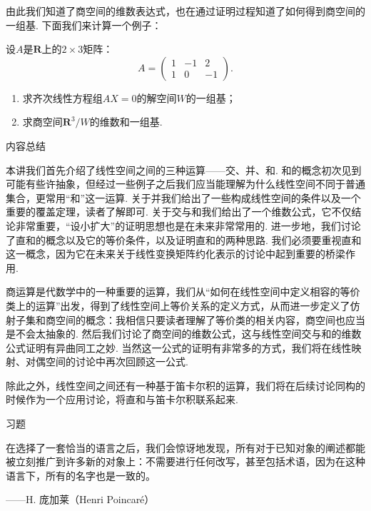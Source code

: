 由此我们知道了商空间的维数表达式，也在通过证明过程知道了如何得到商空间的一组基. 下面我们来计算一个例子：

\begin{example}{}{}
    设$A$是$\mathbf{R}$上的$2\times 3$矩阵：
    \[A=\begin{pmatrix}
            1 & -1 & 2 \\ 1 & 0 & -1
        \end{pmatrix}.\]
    \begin{enumerate}
        \item 求齐次线性方程组$AX=0$的解空间$W$的一组基；

        \item 求商空间$\mathbf{R}^3/W$的维数和一组基.
    \end{enumerate}
\end{example}

\begin{solution}

\end{solution}

\vspace{2ex}
\centerline{\heiti \Large 内容总结}

本讲我们首先介绍了线性空间之间的三种运算——交、并、和. 和的概念初次见到可能有些许抽象，但经过一些例子之后我们应当能理解为什么线性空间不同于普通集合，更常用``和''这一运算. 关于并我们给出了一些构成线性空间的条件以及一个重要的覆盖定理，读者了解即可. 关于交与和我们给出了一个维数公式，它不仅结论非常重要，``设小扩大''的证明思想也是在未来非常常用的. 进一步地，我们讨论了直和的概念以及它的等价条件，以及证明直和的两种思路. 我们必须要重视直和这一概念，因为它在未来关于线性变换矩阵约化表示的讨论中起到重要的桥梁作用.

商运算是代数学中的一种重要的运算，我们从``如何在线性空间中定义相容的等价类上的运算''出发，得到了线性空间上等价关系的定义方式，从而进一步定义了仿射子集和商空间的概念：我相信只要读者理解了等价类的相关内容，商空间也应当是不会太抽象的. 然后我们讨论了商空间的维数公式，这与线性空间交与和的维数公式证明有异曲同工之妙. 当然这一公式的证明有非常多的方式，我们将在线性映射、对偶空间的讨论中再次回顾这一公式.

除此之外，线性空间之间还有一种基于笛卡尔积的运算，我们将在后续讨论同构的时候作为一个应用讨论，将直和与笛卡尔积联系起来.

\vspace{2ex}
\centerline{\heiti \Large 习题}

\vspace{2ex}
{\kaishu 在选择了一套恰当的语言之后，我们会惊讶地发现，所有对于已知对象的阐述都能被立刻推广到许多新的对象上：不需要进行任何改写，甚至包括术语，因为在这种语言下，所有的名字也是一致的。}
\begin{flushright}
    \kaishu
    ——H. 庞加莱（Henri Poincaré）
\end{flushright}

